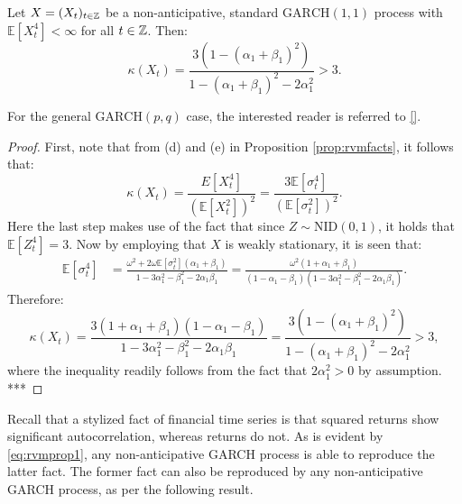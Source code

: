 \begin{prop}
Let $X=(X_{t})_{t\in\mathbb{Z}}$ be a non-anticipative, standard $\mathrm{GARCH}(1,1)$ process with $\mathbb{E}[X_{t}^{4}]<\infty$ for all $t\in\mathbb{Z}$. Then:
\begin{equation}
    \kappa(X_{t})=\frac{3\left(1-(\alpha_{1}+\beta_{1})^{2}\right)}{1-(\alpha_{1}+\beta_{1})^{2}-2\alpha_{1}^{2}}>3.
\end{equation}
\end{prop}
For the general $\mathrm{GARCH}(p,q)$ case, the interested reader is referred to \ref{}. %
\begin{proof}
First, note that from (d) and (e) in Proposition \ref{prop:rvmfacts}, it follows that:
\begin{equation*}
    \kappa(X_{t})=\frac{E[X_{t}^{4}]}{(\mathbb{E}[X_{t}^{2}])^{2}}=\frac{3\mathbb{E}[\sigma_{t}^{4}]}{(\mathbb{E}[\sigma_{t}^{2}])^{2}}.
\end{equation*}
Here the last step makes use of the fact that since $Z\sim\mathrm{NID}(0,1)$, it holds that $\mathbb{E}[Z_{t}^{4}]=3$. Now by employing that $X$ is weakly stationary, it is seen that:
\begin{align*}
    \mathbb{E}[\sigma_{t}^{4}]&=\frac{\omega^{2}+2\omega\mathbb{E}[\sigma_{t}^{2}](\alpha_{1}+\beta_{1})}{1-3\alpha_{1}^{2}-\beta_{1}^{2}-2\alpha_{1}\beta_{1}}%
    =\frac{\omega^{2}(1+\alpha_{1}+\beta_{1})}{(1-\alpha_{1}-\beta_{1})(1-3\alpha_{1}^{2}-\beta_{1}^{2}-2\alpha_{1}\beta_{1})}.
\end{align*}
Therefore:
\begin{equation*}
    \kappa(X_{t})=\frac{3(1+\alpha_{1}+\beta_{1})(1-\alpha_{1}-\beta_{1})}{1-3\alpha_{1}^{2}-\beta_{1}^{2}-2\alpha_{1}\beta_{1}}=\frac{3\left(1-(\alpha_{1}+\beta_{1})^{2}\right)}{1-(\alpha_{1}+\beta_{1})^{2}-2\alpha_{1}^{2}}>3,
\end{equation*}
where the inequality readily follows from the fact that $2\alpha_{1}^{2}>0$ by assumption. ***
\end{proof}
Recall that a stylized fact of financial time series is that squared returns show significant autocorrelation, whereas returns do not. As is evident by \eqref{eq:rvmprop1}, any non-anticipative GARCH process is able to reproduce the latter fact. The former fact can also be reproduced by any non-anticipative GARCH process, as per the following result.

